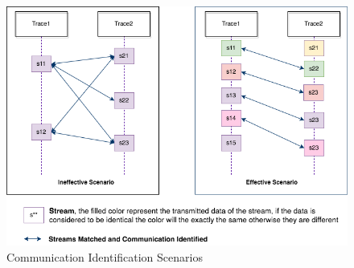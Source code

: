 \begin{figure}[H]
\centerline{\includegraphics[scale=0.5]{Figures/secondlevelmatching}}
 \caption{Communication Identification Scenarios}
\label{secondlevelmatching}
\end{figure}




